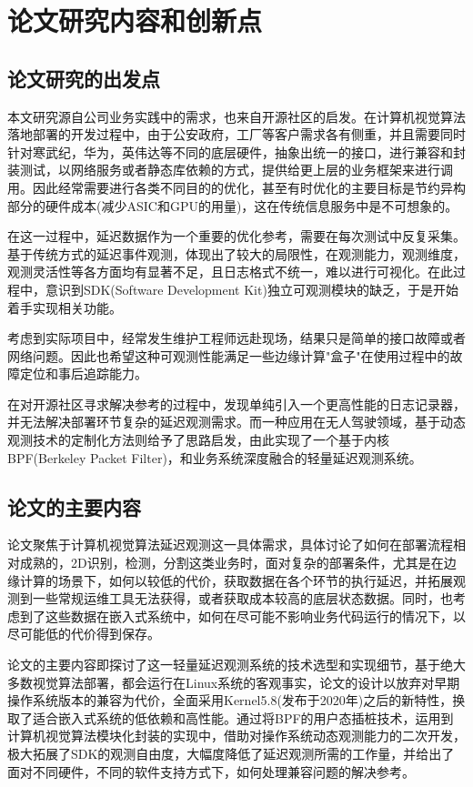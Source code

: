 \documentclass[master]{shtthesis}
\begin{document}
\section{论文研究内容和创新点}\label{论文研究内容和创新点}
\subsection{论文研究的出发点}\label{论文研究的出发点}
本文研究源自公司业务实践中的需求，也来自开源社区的启发。在计算机视觉算法落地部署的开发过程中，由于公安政府，工厂等客户需求各有侧重，并且需要同时针对寒武纪，华为，英伟达等不同的底层硬件，抽象出统一的接口，进行兼容和封装测试，以网络服务或者静态库依赖的方式，提供给更上层的业务框架来进行调用。因此经常需要进行各类不同目的的优化，甚至有时优化的主要目标是节约异构部分的硬件成本(减少ASIC和GPU的用量)，这在传统信息服务中是不可想象的。

在这一过程中，延迟数据作为一个重要的优化参考，需要在每次测试中反复采集。基于传统方式的延迟事件观测，体现出了较大的局限性，在观测能力，观测维度，观测灵活性等各方面均有显著不足，且日志格式不统一，难以进行可视化。在此过程中，意识到SDK(Software Development Kit)独立可观测模块的缺乏，于是开始着手实现相关功能。

考虑到实际项目中，经常发生维护工程师远赴现场，结果只是简单的接口故障或者网络问题。因此也希望这种可观测性能满足一些边缘计算"盒子"在使用过程中的故障定位和事后追踪能力。

在对开源社区寻求解决参考的过程中，发现单纯引入一个更高性能的日志记录器，并无法解决部署环节复杂的延迟观测需求。而一种应用在无人驾驶领域，基于动态观测技术的定制化方法\cite{bpfgpu}则给予了思路启发，由此实现了一个基于内核BPF(Berkeley Packet Filter)\cite{mccanne1993bsd}，和业务系统深度融合的轻量延迟观测系统。
\subsection{论文的主要内容}\label{论文的主要内容}
论文聚焦于计算机视觉算法延迟观测这一具体需求，具体讨论了如何在部署流程相对成熟的，2D识别，检测，分割这类业务时，面对复杂的部署条件，尤其是在边缘计算的场景下，如何以较低的代价，获取数据在各个环节的执行延迟，并拓展观测到一些常规运维工具无法获得，或者获取成本较高的底层状态数据。同时，也考虑到了这些数据在嵌入式系统中，如何在尽可能不影响业务代码运行的情况下，以尽可能低的代价得到保存。

论文的主要内容即探讨了这一轻量延迟观测系统的技术选型和实现细节，基于绝大多数视觉算法部署，都会运行在Linux系统的客观事实，论文的设计以放弃对早期操作系统版本的兼容为代价，全面采用Kernel5.8(发布于2020年)\cite{bpfring}之后的新特性，换取了适合嵌入式系统的低依赖和高性能。通过将BPF的用户态插桩技术，运用到计算机视觉算法模块化封装的实现中，借助对操作系统动态观测能力的二次开发，极大拓展了SDK的观测自由度，大幅度降低了延迟观测所需的工作量，并给出了面对不同硬件，不同的软件支持方式下，如何处理兼容问题的解决参考。
\end{document}
